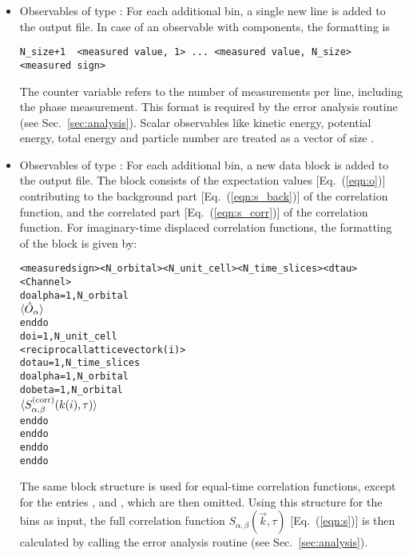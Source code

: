 \begin{itemize}
\item Observables of type :
For each additional bin, a single new line is added to the output file.
In case of an observable with  components, the formatting is 
{\small
\begin{verbatim}
N_size+1  <measured value, 1> ... <measured value, N_size>  <measured sign>
\end{verbatim}
}
The counter variable  refers to the number of measurements per line, including the phase measurement. 
This format is required by the error analysis routine (see Sec.~\ref{sec:analysis}). 
Scalar observables like kinetic energy, potential energy, total energy and particle number are treated as a vector 
of size .

\item Observables of type :
For each additional bin, a new data block is added to the output file. 
The block consists of the expectation values [Eq.~(\ref{eqn:o})] contributing to the background part [Eq.~(\ref{eqn:s_back})] of the correlation function,
and the correlated part [Eq.~(\ref{eqn:s_corr})] of the correlation function.
For imaginary-time displaced correlation functions, the formatting of the block is given by:
{\small
\begin{alltt}
<measured sign> <N_orbital> <N_unit_cell> <N_time_slices> <dtau> <Channel>
do alpha = 1, N_orbital
   \(\langle\hat{O}\sb{\alpha}\rangle \)
enddo
do i = 1, N_unit_cell
   <reciprocal lattice vector k(i)>
   do tau = 1, N_time_slices
      do alpha = 1, N_orbital
         do beta = 1, N_orbital
            \(\langle{S}\sb{\alpha,\beta}\sp{(\mathrm{corr})}(k(i),\tau)\rangle\)
         enddo
      enddo
   enddo
enddo
\end{alltt}
}
The same block structure is used for equal-time correlation functions, except for the entries  ,  and , which are then omitted.
Using this structure for the bins as input, the full correlation function $S_{\alpha,\beta}(\vec{k},\tau)$ [Eq.~(\ref{eqn:s})] is then calculated by calling the error analysis routine (see Sec.~\ref{sec:analysis}).
\end{itemize}


%

